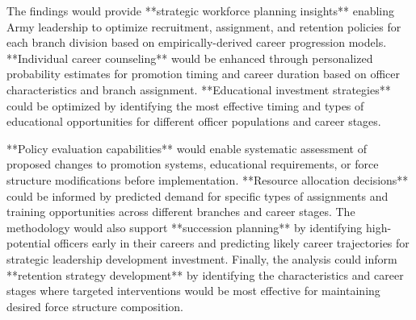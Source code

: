 \documentclass[main.tex]{subfiles}
\begin{document}
The findings would provide **strategic workforce planning insights** enabling Army leadership to optimize recruitment, assignment, and retention policies for each branch division based on empirically-derived career progression models. **Individual career counseling** would be enhanced through personalized probability estimates for promotion timing and career duration based on officer characteristics and branch assignment. **Educational investment strategies** could be optimized by identifying the most effective timing and types of educational opportunities for different officer populations and career stages.

**Policy evaluation capabilities** would enable systematic assessment of proposed changes to promotion systems, educational requirements, or force structure modifications before implementation. **Resource allocation decisions** could be informed by predicted demand for specific types of assignments and training opportunities across different branches and career stages. The methodology would also support **succession planning** by identifying high-potential officers early in their careers and predicting likely career trajectories for strategic leadership development investment. Finally, the analysis could inform **retention strategy development** by identifying the characteristics and career stages where targeted interventions would be most effective for maintaining desired force structure composition.

\end{document}
